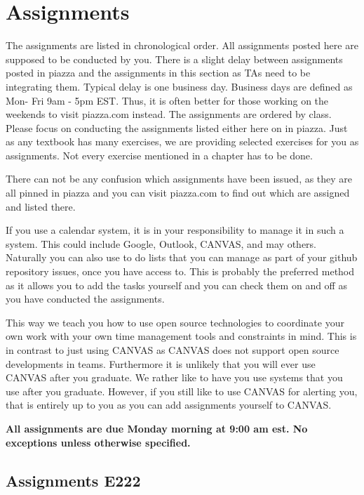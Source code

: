 \chapter{Assignments}\label{c:assignments}

The assignments are listed in chronological order. All
assignments posted here are supposed to be conducted by you. There is
a slight delay between assignments posted in piazza and the
assignments in this section as TAs need to be integrating
them. Typical delay is one business day. Business days are defined as
Mon- Fri 9am - 5pm EST. Thus, it is often better for those working on
the weekends to visit piazza.com instead. The assignments are ordered by class. Please focus on conducting the
assignments listed either here on in piazza. Just as any textbook has
many exercises, we are providing selected exercises for you as
assignments. Not every exercise mentioned in a chapter has to be done.

\begin{IU}
There can not be any confusion which assignments have been
issued, as they are all pinned in piazza and you can visit piazza.com
to find out which are assigned and listed there.
\end{IU}

If you use a calendar system, it is in your responsibility
to manage it in such a system. This could include Google, Outlook,
CANVAS, and may others. Naturally you can also use to do lists that
you can manage as part of your github repository issues, once you have
access to. This is probably the preferred method as it allows you to
add the tasks yourself and you can check them on and off as you have
conducted the assignments. 

This way we teach you how to use open source technologies to
coordinate your own work with your own time management tools and
constraints in mind. This is in contrast to just using CANVAS as
CANVAS does not support open source developments in teams. Furthermore
it is unlikely that you will ever use CANVAS after you graduate. We
rather like to have you use systems that you use after you graduate.
However, if you still like to use CANVAS for alerting you, that is
entirely up to you as you can add assignments yourself to CANVAS. 

\smallskip

{\bf{All assignments are due Monday morning at 9:00 am est. No exceptions unless otherwise specified.}}

\section{Assignments E222}
\label{s:e222-assignment}
\label{s:e222-assignments}

